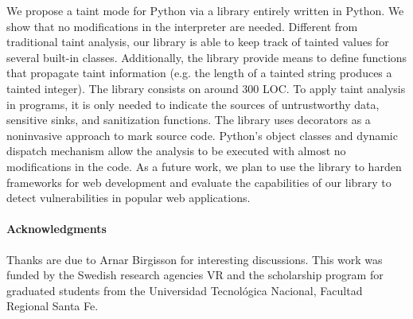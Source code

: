 \documentclass[oribibl]{llncs}
\begin{document}
We propose a taint mode for Python via a library entirely written
in Python.
We show that no modifications in the interpreter are needed. 
Different from traditional taint analysis, our library
is able to 
keep track of tainted values for  
several built-in classes.
Additionally, the library provide means to define functions that 
propagate taint information
(e.g. the length of a tainted string produces a
tainted integer). The library consists on around 300 LOC.
To apply taint analysis in programs, it is only needed 
to indicate the sources of untrustworthy data, sensitive 
sinks, and sanitization functions. The library uses decorators 
as a noninvasive approach to mark source code. 
Python's object classes 
and dynamic dispatch mechanism allow the analysis to be executed with almost no modifications
in the  code. %
As a future work, we plan to use the library to harden frameworks
for web development and evaluate the capabilities of our library to 
detect vulnerabilities
in popular web applications.


{\small{
\paragraph{Acknowledgments}
Thanks are due to Arnar Birgisson for interesting discussions.
This work was funded by the Swedish research agencies VR and 
the scholarship program for graduated students 
from the Universidad Tecnol\'{o}gica Nacional, Facultad Regional Santa Fe. 
}}

{\small{


}}
\end{document}

